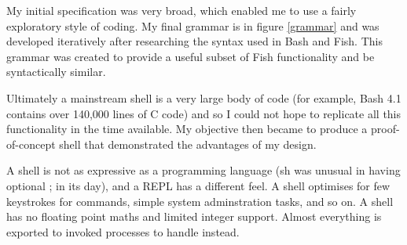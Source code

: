 \documentclass[12pt,twoside,notitlepage]{report}
\begin{document}
My initial specification was very broad, which enabled me to use a
fairly exploratory style of coding. My final grammar is in figure
\ref{grammar} and was developed iteratively after researching the
syntax used in Bash and Fish. This grammar was created to provide a
useful subset of Fish functionality and be syntactically similar.

Ultimately a mainstream shell is a very large body of code (for
example, Bash 4.1 contains over 140,000 lines of C
code\footnotemark[1]) and so I could not hope to replicate all this
functionality in the time available. My objective then became to
produce a proof-of-concept shell that demonstrated the advantages of
my design.




A shell is not as expressive as a programming language (sh was unusual in having
optional ; in its day), and a REPL has a different feel. A shell optimises for
few keystrokes for commands, simple system adminstration tasks, and so on. A
shell has no floating point maths and limited integer support. Almost everything
is exported to invoked processes to handle instead.


\end{document}
